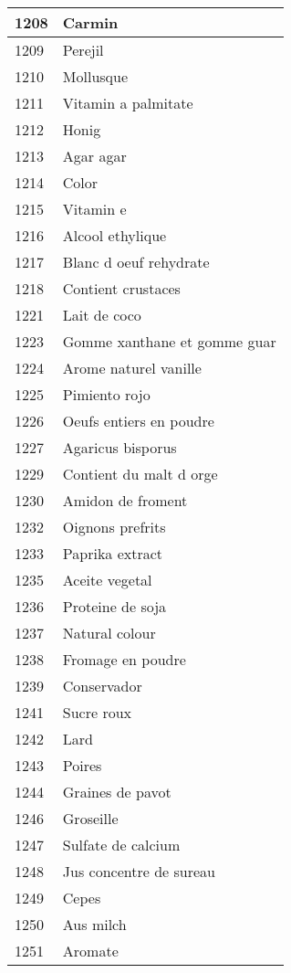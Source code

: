 \begin{longtable}{|l|l|}
1208 & Carmin \\ \hline 
1209 & Perejil \\ \hline 
1210 & Mollusque \\ \hline 
1211 & Vitamin a palmitate \\ \hline 
1212 & Honig \\ \hline 
1213 & Agar agar \\ \hline 
1214 & Color \\ \hline 
1215 & Vitamin e \\ \hline 
1216 & Alcool ethylique \\ \hline 
1217 & Blanc d oeuf rehydrate \\ \hline 
1218 & Contient crustaces \\ \hline 
1221 & Lait de coco \\ \hline 
1223 & Gomme xanthane et gomme guar \\ \hline 
1224 & Arome naturel vanille \\ \hline 
1225 & Pimiento rojo \\ \hline 
1226 & Oeufs entiers en poudre \\ \hline 
1227 & Agaricus bisporus \\ \hline 
1229 & Contient du malt d orge \\ \hline 
1230 & Amidon de froment \\ \hline 
1232 & Oignons prefrits \\ \hline 
1233 & Paprika extract \\ \hline 
1235 & Aceite vegetal \\ \hline 
1236 & Proteine de soja \\ \hline 
1237 & Natural colour \\ \hline 
1238 & Fromage en poudre \\ \hline 
1239 & Conservador \\ \hline 
1241 & Sucre roux \\ \hline 
1242 & Lard \\ \hline 
1243 & Poires \\ \hline 
1244 & Graines de pavot \\ \hline 
1246 & Groseille \\ \hline 
1247 & Sulfate de calcium \\ \hline 
1248 & Jus concentre de sureau \\ \hline 
1249 & Cepes \\ \hline 
1250 & Aus milch \\ \hline 
1251 & Aromate \\ \hline 

\end{longtable}
